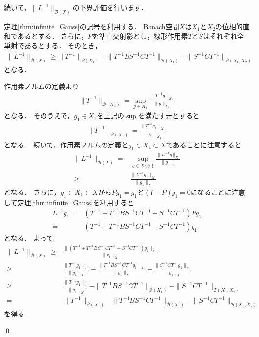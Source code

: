続いて，$\| L^{-1} \|_{{\mathcal B}(X)}$の下界評価を行います．

\begin{Thm}
定理\ref{thm:infinite_Gauss}の記号を利用する．
Banach空間$X$は$X_1$と$X_2$の位相的直和であるとする．
さらに，$P$を準直交射影とし，線形作用素$T$と$S$はそれぞれ全単射であるとする．
そのとき，
	\begin{align*}
		\| L^{-1} \|_{{\mathcal B}(X)} \ge \| T^{-1} \|_{{\mathcal B}(X_1)} - \| T^{-1} B S^{-1} C T^{-1} \|_{{\mathcal B}(X_1)} - \|  S^{-1} C T^{-1}  \|_{{\mathcal B}(X_1, X_2)}
	\end{align*}
となる．
\end{Thm}

\begin{Proof}
作用素ノルムの定義より
	\begin{align*}
		\| T^{-1} \|_{{\mathcal B}(X_1)} = \sup_{g \in X_1} \frac{ \| T^{-1} g \|_{X_1} }{ \| g \|_{X_1} }
	\end{align*}
となる．
そのうえで，$g_1 \in X_1$を上記の$\sup$を満たす元とすると
	\begin{align*}
		\| T^{-1} \|_{{\mathcal B}(X_1)} = \frac{ \| T^{-1} g_1 \|_{X_1} }{ \| g_1 \|_{X_1} }
	\end{align*}
となる．
続いて，作用素ノルムの定義と$g_1 \in X_1 \subset X$であることに注意すると
	\begin{align*}
		\| L^{-1} \|_{{\mathcal B}(X)} =& \sup_{ g \in X \setminus \{ 0 \} } \frac{ \| L^{-1} g \|_{X} }{ \| g \|_{X} } \\
		\ge& \frac{ \| L^{-1} g_1 \|_{X} }{ \| g_1 \|_{X} }
	\end{align*}
となる．
さらに，$g_1 \in X_1 \subset X$から$Pg_1 = g_1$と$(I - P)g_1 = 0$になることに注意して定理\ref{thm:infinite_Gauss}を利用すると
	\begin{align*}
		L^{-1} g_1 =& (T^{-1} + T^{-1} B S^{-1} C T^{-1} - S^{-1} C T^{-1})Pg_1 \\
		=& (T^{-1} + T^{-1} B S^{-1} C T^{-1} - S^{-1} C T^{-1}) g_1
	\end{align*}
となる．
よって
	\begin{align*}
		\| L^{-1} \|_{{\mathcal B}(X)} \ge& \frac{ \|  (T^{-1} + T^{-1} B S^{-1} C T^{-1} - S^{-1} C T^{-1}) g_1 \|_{X} }{ \| g_1 \|_{X} } \\
		\ge& \frac{ \|  T^{-1} g_1 \|_{X} }{ \| g_1 \|_{X} } - \frac{ \|   T^{-1} B S^{-1} C T^{-1} g_1 \|_{X} }{ \| g_1 \|_{X} } -  \frac{ \|  S^{-1} C T^{-1} g_1 \|_{X} }{ \| g_1 \|_{X} } \\
		\ge& \frac{ \|  T^{-1} g_1 \|_{X} }{ \| g_1 \|_{X} }  - \| T^{-1} B S^{-1} C T^{-1} \|_{{\mathcal B}(X_1)} - \|  S^{-1} C T^{-1}  \|_{{\mathcal B}(X_1, X_2)} \\
		=&  \| T^{-1} \|_{{\mathcal B}(X_1)} - \| T^{-1} B S^{-1} C T^{-1} \|_{{\mathcal B}(X_1)} - \|  S^{-1} C T^{-1}  \|_{{\mathcal B}(X_1, X_2)}
	\end{align*}
を得る．

\qed
\end{Proof}




